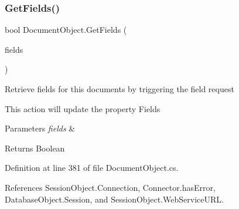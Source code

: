 \subsubsection{\texorpdfstring{Get\+Fields()}{GetFields()}\hspace{0.1cm}{\footnotesize\ttfamily [2/2]}}
{\footnotesize\ttfamily bool Document\+Object.\+Get\+Fields (\begin{DoxyParamCaption}\item[{I\+List}]{fields }\end{DoxyParamCaption})}



Retrieve fields for this documents by triggering the field request 

This action will update the property \textquotesingle{}Fields\textquotesingle{}


\begin{DoxyParams}{Parameters}
{\em fields} & \\
\hline
\end{DoxyParams}
\begin{DoxyReturn}{Returns}
Boolean
\end{DoxyReturn}


Definition at line 381 of file Document\+Object.\+cs.



References Session\+Object.\+Connection, Connector.\+has\+Error, Database\+Object.\+Session, and Session\+Object.\+Web\+Service\+U\+RL.


